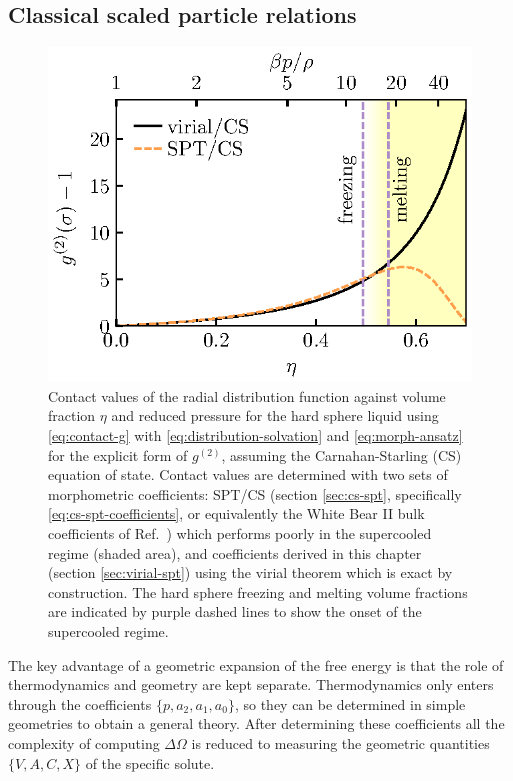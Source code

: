 \documentclass[11pt,twoside]{report}
\begin{document}
\subsection{Classical scaled particle relations}
\label{sec:classical-spt}

\begin{figure}
  \includegraphics[width=\linewidth,outer]{g2-contact}
  \caption[Contact values of pair distribution function $g^{(2)}(r)$]{
    Contact values of the radial distribution function against volume fraction $\eta$ and reduced pressure for the hard sphere liquid using \eqref{eq:contact-g} with \eqref{eq:distribution-solvation} and \eqref{eq:morph-ansatz} for the explicit form of $g^{(2)}$, assuming the Carnahan-Starling (CS) equation of state.
    Contact values are determined with two sets of morphometric coefficients: SPT/CS (section \ref{sec:cs-spt}, specifically \eqref{eq:cs-spt-coefficients}, or equivalently the White Bear II bulk coefficients of Ref.\ \cite{Hansen-GoosJPCM2006}) which performs poorly in the supercooled regime (shaded area), and coefficients derived in this chapter (section \ref{sec:virial-spt}) using the virial theorem which is exact by construction.
    The hard sphere freezing and melting volume fractions are indicated by purple dashed lines to show the onset of the supercooled regime.
  }
  \label{fig:contact-g}
\end{figure}

The key advantage of a geometric expansion of the free energy is that the role of thermodynamics and geometry are kept separate.
Thermodynamics only enters through the coefficients $\{p,a_2,a_1,a_0\}$, so they can be determined in simple geometries to obtain a general theory.
After determining these coefficients all the complexity of computing $\Delta \Omega$ is reduced to measuring the geometric quantities $\{V,A,C,X\}$ of the specific solute.
\end{document}
